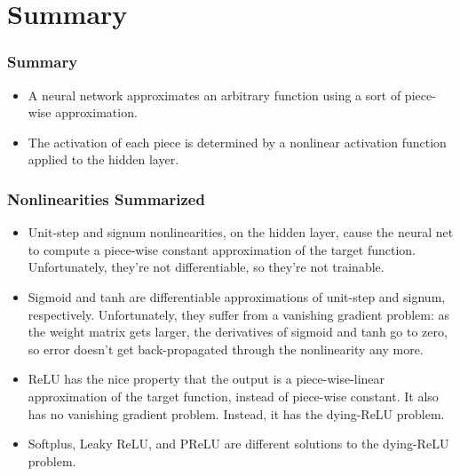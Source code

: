 \documentclass{beamer}
\begin{document}
\section[Summary]{Summary}
\setcounter{subsection}{1}

\begin{frame}
  \frametitle{Summary}
  \begin{itemize}
  \item A neural network approximates an arbitrary function using a sort of piece-wise approximation.
  \item The activation of each piece is determined by a nonlinear activation function applied to
    the hidden layer.
  \end{itemize}
\end{frame}

\begin{frame}
  \frametitle{Nonlinearities Summarized}
  \begin{itemize}
  \item Unit-step and signum nonlinearities, on the hidden layer,
    cause the neural net to compute a piece-wise constant approximation
    of the target function. Unfortunately, they're not differentiable, so they're not
    trainable.
  \item Sigmoid and tanh are differentiable approximations of
    unit-step and signum, respectively.  Unfortunately, they suffer
    from a vanishing gradient problem: as the weight matrix gets
    larger, the derivatives of sigmoid and tanh go to zero, so error
    doesn't get back-propagated through the nonlinearity any more.
  \item ReLU has the nice property that the output is a
    piece-wise-linear approximation of the target function, instead of
    piece-wise constant.  It also has no vanishing gradient problem.
    Instead, it has the dying-ReLU problem.
  \item Softplus, Leaky ReLU, and PReLU are different solutions to the
    dying-ReLU problem.
  \end{itemize}
\end{frame}
\end{document}
